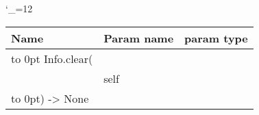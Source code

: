 \begingroup \catcode`\_=12 \tt
\begin{tabular}{lll}
\toprule
\textrm{Name}&\textrm{Param name}&\textrm{param type}\\
\midrule
\hbox to 0pt {Info.clear(\hss}\\
& self\\
\hbox to 0pt{) -> None\hss}\\
\bottomrule
\end{tabular}
\endgroup

